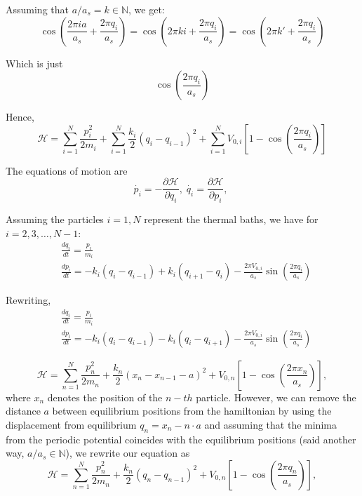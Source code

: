 Assuming that $ a/a_s = k\in \mathbb{N} $, we get:
\[ 
\cos \left( \frac{2\pi i a}{a_{s}} + \frac{2\pi q_{i}}{a_{s}}\right) = 
\cos \left( 2\pi k i  + \frac{2\pi q_{i}}{a_{s}}\right) = 
\cos \left( 2\pi k'  + \frac{2\pi q_{i}}{a_{s}}\right)
\]

Which is just
\[ \cos \left( \frac{2\pi q_{i}}{a_{s}}\right) \]

Hence, 
\[ 
\mathcal{H} = \sum_{i=1}^{N}\frac{p_{i}^{2}}{2m_i} + 
\sum_{i=1}^{N} \frac{k_i}{2}(q_{i} - q_{i-1})^{2} +
\sum_{i=1}^{N} V_{0,i}\left[1 - 
\cos \left( \frac{2\pi q_{i}}{a_{s}}\right)\right]
\]

The equations of motion are
\[
\dot{p_i} = -\frac{\partial\mathcal{H}}{\partial q_i}, \;
\dot{q_i} = \frac{\partial\mathcal{H}}{\partial p_i}, \;
\]

Assuming the particles $ i=1,N $ represent the thermal baths, we have for $ i=2, 3, \dots, N-1 $:
\begin{align*}
&\frac{dq_i}{dt} = \frac{p_{i}}{m_i} \\
&\frac{dp_i}{dt} = -k_{i}(q_{i}-q_{i-1}) + k_{i}(q_{i+1}-q_i) - 
\frac{2\pi V_{0,i}}{a_s}\sin \left(\frac{2\pi q_i}{a_s}\right)
\end{align*}

Rewriting, 
\begin{align*}
&\frac{dq_i}{dt} = \frac{p_{i}}{m_i} \\
&\frac{dp_i}{dt} = -k_{i}(q_{i}-q_{i-1}) - k_{i}(q_{i} - q_{i+1}) - 
\frac{2\pi V_{0,i}}{a_s}\sin \left(\frac{2\pi q_i}{a_s}\right)
\end{align*}

\[ 
\mathcal{H} = \sum_{n=1}^{N}\frac{p_{n}^{2} }{2m_{n} } + 
\frac{k_{n} }{2 }\left(x_{n}-x_{n-1}-a \right)^{2} +
V_{0,n}\left[1-\cos \left(\frac{2\pi x_{n}}{a_{s}}\right)\right],
\]
where $ x_{n} $ denotes the position of the $ n-th $ particle. However, we can remove the distance $ a $ between equilibrium positions from the hamiltonian by using the displacement from equilibrium $ q_{n} = x_{n}-n\cdot a $ and assuming that the minima from the periodic potential coincides with the equilibrium positions (said another way, $ a/a_{s}\in \mathbb{N} $), we rewrite our equation as
\[ 
\mathcal{H} = \sum_{n=1}^{N}\frac{p_{n}^{2} }{2m_{n} } + 
\frac{k_{n} }{2 }\left(q_{n}-q_{n-1}\right)^{2} +
V_{0,n}\left[1-\cos \left(\frac{2\pi q_{n}}{a_{s}}\right)\right],
\]


